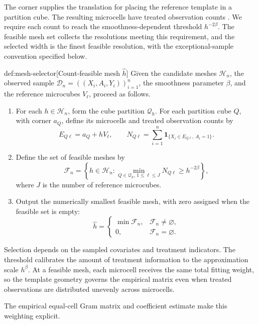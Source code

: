 \documentclass[11pt]{article}
\begin{document}
The corner  supplies the translation for placing the reference template in a partition cube. The resulting microcells  have treated observation counts . We require each count to reach the smoothness-dependent threshold \(h^{-2\beta}\). The feasible mesh set  collects the resolutions meeting this requirement, and the selected width  is the finest feasible resolution, with the exceptional-sample convention specified below.

\begin{algorithmv}{def:mesh-selector}[Count-feasible mesh $\widehat h$]
Given the candidate meshes \(\mathcal H_n\), the observed sample \(\mathcal D_n=((X_i,A_i,Y_i))_{i=1}^n\), the smoothness parameter \(\beta\), and the reference microcubes \(V_\ell\), proceed as follows.
\begin{enumerate}
\item For each \(h\in\mathcal H_n\), form the cube partition \(\mathcal Q_h\). For each partition cube \(Q\), with corner \(a_Q\), define its microcells and treated observation counts by
\[
E_{Q\ell}=a_Q+hV_\ell,
\qquad
N_{Q\ell}=\sum_{i=1}^n\mathbf 1_{\{X_i\in E_{Q\ell},\,A_i=1\}}.
\]
\item Define the set of feasible meshes by
\[
\mathcal F_n
=
\left\{h\in\mathcal H_n:
\min_{Q\in\mathcal Q_h,\,1\le\ell\le J}N_{Q\ell}
\ge h^{-2\beta}\right\},
\]
where \(J\) is the number of reference microcubes.
\item Output the numerically smallest feasible mesh, with zero assigned when the feasible set is empty:
\[
\widehat h=
\begin{cases}
\min\mathcal F_n,&\mathcal F_n\ne\varnothing,\\
0,&\mathcal F_n=\varnothing.
\end{cases}
\]
\end{enumerate}
\end{algorithmv}

Selection depends on the sampled covariates and treatment indicators. The threshold calibrates the amount of treatment information to the approximation scale \(h^\beta\). At a feasible mesh, each microcell receives the same total fitting weight, so the template geometry governs the empirical matrix even when treated observations are distributed unevenly across microcells.

The empirical equal-cell Gram matrix  and coefficient estimate  make this weighting explicit.
\end{document}

